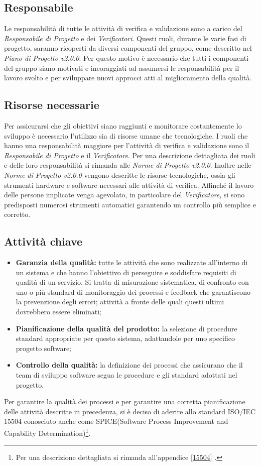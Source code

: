 \subsection{Responsabile}
Le responsabilità di tutte le attività di verifica e validazione sono a carico del \textit{Responsabile di Progetto} e dei \textit{Verificatori}. Questi ruoli, durante le varie fasi di progetto, saranno ricoperti da diversi componenti del gruppo, come descritto nel \textit{Piano di Progetto v2.0.0}. Per questo motivo è necessario che tutti i componenti del gruppo siano motivati e incoraggiati ad assumersi le responsabilità per il lavoro svolto e per sviluppare nuovi approcci atti al miglioramento della qualità.

\subsection{Risorse necessarie}
Per assicurarsi che gli obiettivi siano raggiunti e monitorare costantemente lo sviluppo è necessario l'utilizzo sia di risorse umane che tecnologiche. I ruoli che hanno una responsabilità maggiore per l'attività di verifica e validazione sono il \textit{Responsabile di Progetto} e il \textit{Verificatore}. Per una descrizione dettagliata dei ruoli e delle loro responsabilità si rimanda alle \textit{Norme di Progetto v2.0.0}. Inoltre nelle \textit{Norme di Progetto v2.0.0} vengono descritte le risorse tecnologiche, ossia gli strumenti hardware e software necessari alle attività di verifica. Affinché il lavoro delle persone implicate venga agevolato, in particolare del \textit{Verificatore}, si sono predisposti numerosi strumenti automatici garantendo un controllo più semplice e corretto.

\subsection{Attività chiave}
\begin{itemize}
	\item \textbf{Garanzia della qualità:} tutte le attività che sono realizzate all'interno di un sistema e che hanno l'obiettivo di perseguire e soddisfare requisiti di qualità di un servizio. Si tratta di misurazione sistematica, di confronto con uno o più standard di monitoraggio dei processi e \gls{feedback} che garantiscono la prevenzione degli errori; attività a fronte delle quali questi ultimi dovrebbero essere eliminati;
	\item \textbf{Pianificazione della qualità del prodotto:} la selezione di procedure standard appropriate per questo sistema, adattandole per uno specifico progetto software;
	\item \textbf{Controllo della qualità:} la definizione dei processi che assicurano che il team  di sviluppo software segua le procedure e gli standard adottati nel progetto.
\end{itemize}
Per garantire la qualità dei processi e per garantire una corretta pianificazione delle attività descritte in precedenza, si è deciso di aderire allo standard ISO/IEC 15504 conosciuto anche come SPICE(Software Process Improvement and Capability Determination)\footnote{Per una descrizione dettagliata si rimanda all'appendice \ref{15504} .}.
	
